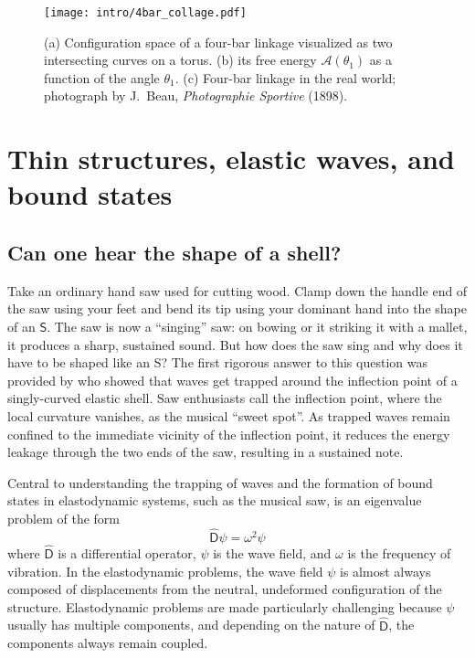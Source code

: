 \begin{figure}
  \begin{center}
    \texttt{[image: intro/4bar\_collage.pdf]}
  \end{center}
\caption{(a) Configuration space of a four-bar linkage visualized as two intersecting curves on a torus. (b) its free energy $\mathscr{A}(\theta_{1})$ as a function of the angle $\theta_{1}$. (c) Four-bar linkage in the real world; photograph by J.~Beau, \emph{Photographie Sportive} (1898).}
  \label{fig:4bar_collage}
\end{figure}

\section{Thin structures, elastic waves, and bound states}

\subsection{Can one hear the shape of a shell?}

Take an ordinary hand saw used for cutting wood.
Clamp down the handle end of the saw using your feet and bend its tip using your dominant hand into the shape of an $\mathsf{S}$.
The saw is now a ``singing'' saw: on bowing or it striking it with a mallet, it produces a sharp, sustained sound.
But how does the saw sing and why does it have to be shaped like an \textsf{S}?
The first rigorous answer to this question was provided by \citet{scott1992} who showed that waves get trapped around the inflection point of a singly-curved elastic shell.
Saw enthusiasts call the inflection point, where the local curvature vanishes, as the musical ``sweet spot''.
As trapped waves remain confined to the immediate vicinity of the inflection point, it reduces the energy leakage through the two ends of the saw, resulting in a sustained note.

Central to understanding the trapping of waves and the formation of bound states in elastodynamic systems, such as the musical saw, is an eigenvalue problem of the form
%
\begin{equation}
  \widehat{\mathsf{D}}\psi = \omega^{2}\psi
\end{equation}
%
where $\widehat{\mathsf{D}}$ is a differential operator, $\psi$ is the wave field, and $\omega$ is the frequency of vibration.
In the elastodynamic problems, the wave field $\psi$ is almost always composed of displacements from the neutral, undeformed configuration of the structure.
Elastodynamic problems are made particularly challenging because $\psi$ usually has multiple components, and depending on the nature of $\hat{\mathsf{D}}$, the components always remain coupled.

